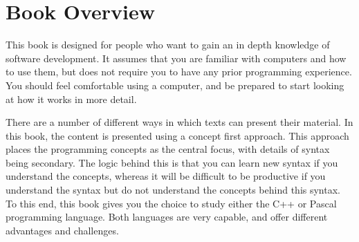 \section*{Book Overview} %
\label{sub:book_overview}

This book is designed for people who want to gain an in depth knowledge of software development. It assumes that you are familiar with computers and how to use them, but does not require you to have any prior programming experience. You should feel comfortable using a computer, and be prepared to start looking at how it works in more detail.

There are a number of different ways in which texts can present their material. In this book, the content is presented using a concept first approach. This approach places the programming concepts as the central focus, with details of syntax being secondary. The logic behind this is that you can learn new syntax if you understand the concepts, whereas it will be difficult to be productive if you understand the syntax but do not understand the concepts behind this syntax. To this end, this book gives you the choice to study either the C++ or Pascal programming language. Both languages are very capable, and offer different advantages and challenges.

